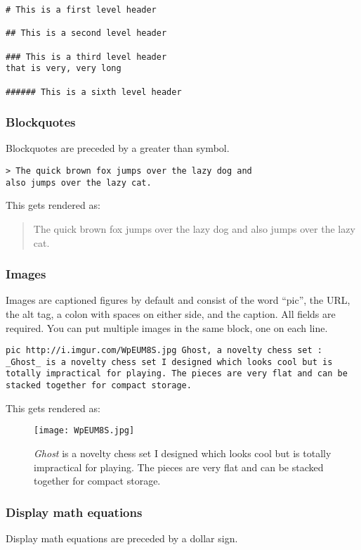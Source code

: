 \begin{lstlisting}
# This is a first level header

## This is a second level header

### This is a third level header
that is very, very long

###### This is a sixth level header
\end{lstlisting}
\subsubsection{Blockquotes}
\label{s2.3.2}
Blockquotes are preceded by a greater than symbol.

\begin{lstlisting}
> The quick brown fox jumps over the lazy dog and
also jumps over the lazy cat.
\end{lstlisting}
This gets rendered as:

\begin{quote}
The quick brown fox jumps over the lazy dog and
also jumps over the lazy cat.\end{quote}
\subsubsection{Images}
\label{s2.3.3}
Images are captioned figures by default and consist of the word ``pic'', the URL, the alt tag, a colon with spaces on either side, and the caption. All fields are required. You can put multiple images in the same block, one on each line.

\begin{lstlisting}
pic http://i.imgur.com/WpEUM8S.jpg Ghost, a novelty chess set : _Ghost_ is a novelty chess set I designed which looks cool but is totally impractical for playing. The pieces are very flat and can be stacked together for compact storage.
\end{lstlisting}
This gets rendered as:

\begin{figure}[htb]
\centering
\texttt{[image: WpEUM8S.jpg]}
\caption{\emph{Ghost} is a novelty chess set I designed which looks cool but is totally impractical for playing. The pieces are very flat and can be stacked together for compact storage.}
\label{fig1}
\end{figure}
\subsubsection{Display math equations}
\label{s2.3.4}
Display math equations are preceded by a dollar sign.

